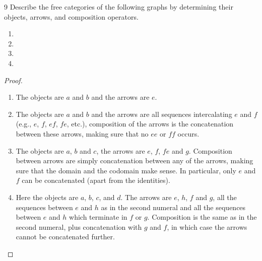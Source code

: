 \begin{exercise}{9}
Describe the free categories of the following graphs by determining their objects, arrows, and composition operators.
\begin{enumerate}
    \item

    \item

    \item

    \item
\end{enumerate}
\end{exercise}
\begin{proof}
\begin{enumerate}
    \item The objects are $a$ and $b$ and the arrows are $e$.
    \item The objects are $a$ and $b$ and the arrows are all sequences intercalating $e$ and $f$ (e.g., $e$, $f$, $ef$, $fe$, etc.), composition of the arrows is the concatenation between these arrows, making sure that no $ee$ or $ff$ occurs.
    \item The objects are $a$, $b$ and $c$, the arrows are $e$, $f$, $fe$ and $g$.
    Composition between arrows are simply concatenation between any of the arrows, making sure that the domain and the codomain make sense.
    In particular, only $e$ and $f$ can be concatenated (apart from the identities).
    \item Here the objects are $a$, $b$, $c$, and $d$.
    The arrows are $e$, $h$, $f$ and $g$, all the sequences between $e$ and $h$ as in the second numeral and all the sequences between $e$ and $h$ which terminate in $f$ or $g$.
    Composition is the same as in the second numeral, plus concatenation with $g$ and $f$, in which case the arrows cannot be concatenated further.
\end{enumerate}
\end{proof} 


